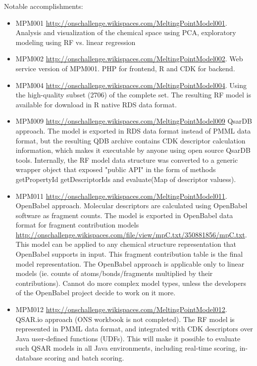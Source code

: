 \documentclass[12pt,letterpaper]{article}
\begin{document}
Notable accomplishments:
\begin{itemize}
  \item MPM001 \url{http://onschallenge.wikispaces.com/MeltingPointModel001}.
  Analysis and visualization of the chemical space using PCA, exploratory 
  modeling using RF vs. linear regression
  \item MPM002 \url{http://onschallenge.wikispaces.com/MeltingPointModel002}.
  Web service version of MPM001. PHP for frontend, R and CDK for backend.
  \item MPM004 \url{http://onschallenge.wikispaces.com/MeltingPointModel004}.
  Using the high-quality subset (2706) of the complete set. The resulting RF
  model is available for download in R native RDS data format.
  \item MPM009 \url{http://onschallenge.wikispaces.com/MeltingPointModel009}
  QsarDB approach. The model is exported in RDS data format instead of PMML
  data format, but the resulting QDB archive contains CDK descriptor calculation
  information, which makes it executable by anyone using open source QsarDB 
  tools. Internally, the RF model data structure was converted to a generic
  wrapper object that exposed "public API" in the form of methods getPropertyId
  getDescriptorIds and evaluate(Map of descriptor valuess).
  \item MPM011 \url{http://onschallenge.wikispaces.com/MeltingPointModel011}.
  OpenBabel approach. Molecular descriptors are calculated using OpenBabel
  software as fragment counts. The model is exported in OpenBabel data format
  for fragment contribution models \url{http://onschallenge.wikispaces.com/file/view/mpC.txt/350881856/mpC.txt}. This model can be applied to any chemical structure
  representation that OpenBabel supports in input. This fragment contribution 
  table is the final model representation. The OpenBabel approach is applicable
  only to linear models (ie. counts of atoms/bonds/fragments multiplied by their
  contributions). Cannot do more complex model types, unless the developers
  of the OpenBabel project decide to work on it more.
  \item MPM012 \url{http://onschallenge.wikispaces.com/MeltingPointModel012}.
  QSAR.io approach (ONS workbook is not completed). The RF model is represented
  in PMML data format, and integrated with CDK descriptors over Java user-defined
  functions (UDFs). This will make it possible to evaluate such QSAR models
  in all Java environments, including real-time scoring, in-database scoring
  and batch scoring.
\end{itemize}
\end{document}
